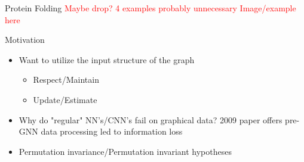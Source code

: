 \documentclass{beamer}
\begin{document}
\begin{frame}{Protein Folding \textcolor{red}{Maybe drop? 4 examples probably unnecessary}}
    \textcolor{red}{Image/example here }
\end{frame}

\begin{frame}{Motivation}
    \begin{itemize}
        \item Want to utilize the input structure of the graph
        \begin{itemize}
            \item Respect/Maintain
            \item Update/Estimate
        \end{itemize} 
        \item \color{red} Why do "regular" NN's/CNN's fail on graphical data? 2009 paper offers pre-GNN data processing led to information loss 
        \item Permutation invariance/Permutation invariant hypotheses 
    \end{itemize}
\end{frame}
\end{document}
